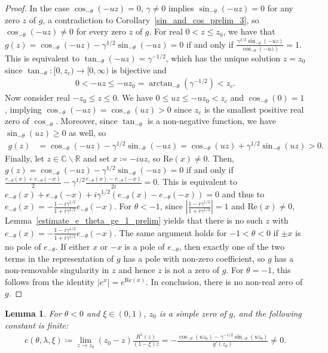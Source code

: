 \documentclass[12pt]{article}
\newcommand{\R}{\mathbb{R}} %
\newcommand{\C}{\mathbb{C}} %
\newcommand{\1}{\mathds{1}}
\renewcommand{\Re}{\mathrm{Re}}
\theoremstyle{definition}
\theoremstyle{plain}
\newtheorem{Lemma}[definition]{Lemma}
\theoremstyle{remark}
\begin{document}
\begin{proof}
 In the case $\cos_{-\theta}(-uz)=0$, $\gamma\neq 0$ implies $\sin_{-\theta}(-uz)=0$ for any zero $z$ of $g$, a contradiction to Corollary~\ref{sin_and_cos_prelim_3}, so $\cos_{-\theta}(-uz)\neq 0$ for every zero $z$ of $g$. For real $0<z\le z_0$, we have that $ g(z)= \cos_{-\theta}(-uz)-\gamma^{1/2}\sin_{-\theta}(-uz)=0$ if and only if $\frac{\gamma^{1/2}\sin_{-\theta}(-uz)}{\cos_{-\theta}(-uz)}=1$. This is equivalent to $\tan_{-\theta}(-uz)=\gamma^{-1/2}$, which has the unique solution $z=z_0$ since $\tan_{-\theta}:[0,z_c)\to[0,\infty)$ is bijective and 
\begin{align*}
    0<-uz\le -uz_0=\arctan_{-\theta}(\gamma^{-1/2})<z_c.
\end{align*}
Now consider real $-z_0\leq z\leq 0$. We have $0\le uz\le-u{z_0}<z_c$ and $\cos_{-\theta}(0)=1$, implying $\cos_{-\theta}(-u{z})=\cos_{-\theta}(u{z})> 0$ since $z_c$ is the smallest positive real zero of $\cos_{-\theta}$. Moreover, since $\tan_{-\theta}$ is a non-negative function, we have $\sin_{-\theta}(uz)\ge0$ as well, so
\begin{align*}
    g(z)&=\cos_{-\theta}(-uz)-\gamma^{1/2}\sin_{-\theta}(-uz)
        =\cos_{-\theta}(uz)+\gamma^{1/2}\sin_{-\theta}(uz)>0.
\end{align*}
Finally, let $z\in\C\backslash \R$ and set $x\coloneqq -iuz$, so $\Re(x)\ne 0$. Then, $g(z)= \cos_{-\theta}(-uz)-\gamma^{1/2}\sin_{-\theta}(-uz)=0$ if and only if $ \frac{e_{-\theta}(x)+e_{-\theta}(-x)}{2}-\gamma^{1/2}\frac{e_{-\theta}(x)-e_{-\theta}(-x)}{2i}=0$. This is equivalent to $ e_{-\theta}(x)+e_{-\theta}(-x)+i\gamma^{1/2}(e_{-\theta}(x)-e_{-\theta}(-x))=0$ and thus to $e_{-\theta}(x)=-\frac{1-i\gamma^{1/2}}{1+i\gamma^{1/2}}e_{-\theta}(-x)$.
For $\theta<-1$, since $\left|\frac{1-i\gamma^{1/2}}{1+i\gamma^{1/2}}\right|=1$ and $\Re(x)\ne 0$, Lemma~\ref{estimate_e_theta_ge_1_prelim} yields that there is no such $z$ with  $e_{-\theta}(x)=-\frac{1-i\gamma^{1/2}}{1+i\gamma^{1/2}}e_{-\theta}(-x)$. The same argument holds for $-1<\theta<0$ if $\pm x$ is no pole of $e_{-\theta}$. If either $x$ or $-x$ is a pole of $e_{-\theta}$, then exactly one of the two terms in the representation of $g$ has a pole with non-zero coefficient, so $g$ has a non-removable singularity in $z$ and hence $z$ is not a zero of $g$. For $\theta=-1$, this follows from the identity $|e^x|=e^{\Re(x)}$. In conclusion, there is no non-real zero of $g$.
\end{proof}
\begin{Lemma}\label{z_0_simple}
   For $\theta<0$ and $\xi\in(0,1)$, $z_0$ is a simple zero of $g$, and the following constant is finite:
   \begin{align}\label{c_non_zero_negtheta}
       c(\theta,\lambda,\xi)\coloneqq \lim_{z\to z_0}\left(z_0-z\right)\frac{R^1(z)}{(1-\xi) z}=-\frac{\cos_{-\theta}(uz_0)-\gamma^{-1/2}\sin_{-\theta}(uz_0)}{g'(z_0)}\neq 0.
  \end{align}
\end{Lemma}
\end{document}
